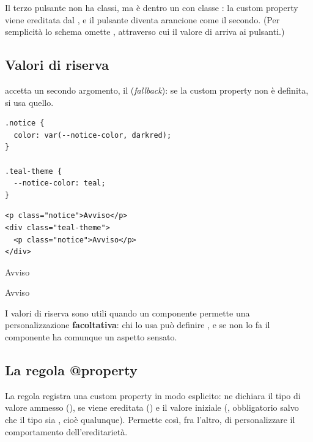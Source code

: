 Il terzo pulsante non ha classi, ma è dentro un  con classe
: la custom property  viene ereditata dal
, e il pulsante diventa arancione come il secondo. (Per semplicità lo
schema omette , attraverso cui il valore di  arriva ai
pulsanti.)

\subsection{Valori di riserva}

 accetta un secondo argomento, il 
(\textit{fallback}): se la custom property non è definita, si usa quello.

\begin{affianco}[0.5][c]
\begin{lstlisting}[style=css, name=notice.css]
.notice {
  color: var(--notice-color, darkred);
}

.teal-theme {
  --notice-color: teal;
}
\end{lstlisting}
\begin{lstlisting}[style=html, name=notice.html]
<p class="notice">Avviso</p>
<div class="teal-theme">
  <p class="notice">Avviso</p>
</div>
\end{lstlisting}
\risultato
\begin{browser}
  \textcolor{css-darkred}{Avviso}\par\vspace{6pt}
  \textcolor{css-teal}{Avviso}
\end{browser}
\end{affianco}

I valori di riserva sono utili quando un componente permette una
personalizzazione \textbf{facoltativa}: chi lo usa può definire
, e se non lo fa il componente ha comunque un aspetto
sensato.

\subsection{La regola @property}

La regola  registra una custom property in modo esplicito:
ne dichiara il tipo di valore ammesso (), se viene ereditata
() e il valore iniziale (, obbligatorio
salvo che il tipo sia , cioè qualunque). Permette così, fra l'altro,
di personalizzare il comportamento dell'ereditarietà.

